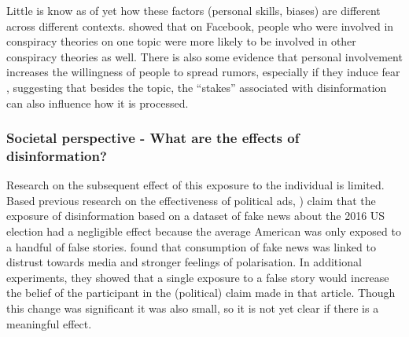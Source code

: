 Little is know as of yet how these factors (personal skills, biases) are different across different contexts. \cite{Bessi2015} showed that on Facebook, people who were involved in conspiracy theories on one topic were more likely to be involved in other conspiracy theories as well. There is also some evidence that personal involvement increases the willingness of people to spread rumors, especially if they induce fear \citep{chua2018intentions}, suggesting that besides the topic, the ``stakes'' associated with disinformation can also influence how it is processed.



\subsubsection{Societal perspective - What are the effects of disinformation?}
Research on the subsequent effect of this exposure to the individual is limited. Based previous research on the effectiveness of political ads, \cite{Allcott2017}) claim that the exposure of disinformation based on a dataset of fake news about the 2016 US election had a negligible effect because the average American was only exposed to a handful of false stories. \cite{Guess2020} found that consumption of fake news was linked to distrust towards media and stronger feelings of polarisation. In additional experiments, they showed that a single exposure to a false story would increase the belief of the participant in the (political) claim made in that article. Though this change was significant it was also small, so it is not yet clear if there is a meaningful effect. \\ 

